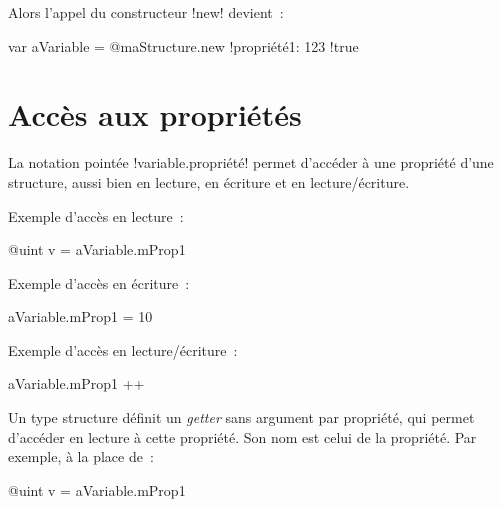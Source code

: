 Alors l'appel du constructeur \ggst!new! devient~:
\begin{galgas3}
var aVariable = @maStructure.new {!propriété1: 123 !true}
\end{galgas3}


%


\section{Accès aux propriétés}

La notation pointée \ggst!variable.propriété! permet d'accéder à une propriété d'une structure, aussi bien en lecture, en écriture et en lecture/écriture.

Exemple d'accès en lecture~:
\begin{galgas3}
@uint v = aVariable.mProp1
\end{galgas3}

Exemple d'accès en écriture~:
\begin{galgas3}
aVariable.mProp1 = 10
\end{galgas3}


Exemple d'accès en lecture/écriture~:
\begin{galgas3}
aVariable.mProp1 ++
\end{galgas3}






Un type structure définit un \emph{getter} sans argument par propriété, qui permet d'accéder en lecture à cette propriété. Son nom est celui de la propriété. Par exemple, à la place de~:
\begin{galgas3}
@uint v = aVariable.mProp1
\end{galgas3}

